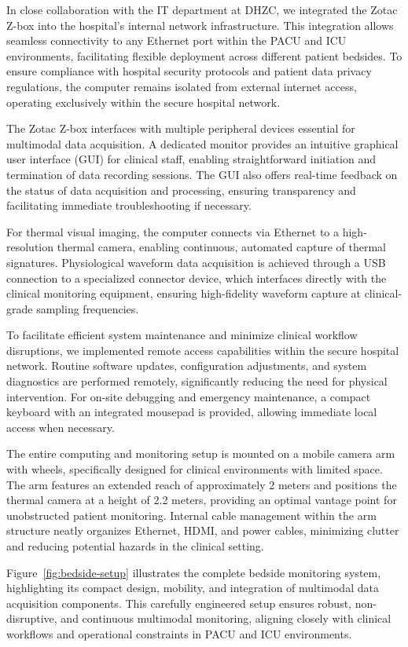 In close collaboration with the IT department at DHZC, we integrated the Zotac Z-box into the hospital's internal network infrastructure. This integration allows seamless connectivity to any Ethernet port within the PACU and ICU environments, facilitating flexible deployment across different patient bedsides. To ensure compliance with hospital security protocols and patient data privacy regulations, the computer remains isolated from external internet access, operating exclusively within the secure hospital network.

The Zotac Z-box interfaces with multiple peripheral devices essential for multimodal data acquisition. A dedicated monitor provides an intuitive graphical user interface (GUI) for clinical staff, enabling straightforward initiation and termination of data recording sessions. The GUI also offers real-time feedback on the status of data acquisition and processing, ensuring transparency and facilitating immediate troubleshooting if necessary.

For thermal visual imaging, the computer connects via Ethernet to a high-resolution thermal camera, enabling continuous, automated capture of thermal signatures. Physiological waveform data acquisition is achieved through a USB connection to a specialized connector device, which interfaces directly with the clinical monitoring equipment, ensuring high-fidelity waveform capture at clinical-grade sampling frequencies.

To facilitate efficient system maintenance and minimize clinical workflow disruptions, we implemented remote access capabilities within the secure hospital network. Routine software updates, configuration adjustments, and system diagnostics are performed remotely, significantly reducing the need for physical intervention. For on-site debugging and emergency maintenance, a compact keyboard with an integrated mousepad is provided, allowing immediate local access when necessary.

The entire computing and monitoring setup is mounted on a mobile camera arm with wheels, specifically designed for clinical environments with limited space. The arm features an extended reach of approximately 2 meters and positions the thermal camera at a height of 2.2 meters, providing an optimal vantage point for unobstructed patient monitoring. Internal cable management within the arm structure neatly organizes Ethernet, HDMI, and power cables, minimizing clutter and reducing potential hazards in the clinical setting.

Figure~\ref{fig:bedside-setup} illustrates the complete bedside monitoring system, highlighting its compact design, mobility, and integration of multimodal data acquisition components. This carefully engineered setup ensures robust, non-disruptive, and continuous multimodal monitoring, aligning closely with clinical workflows and operational constraints in PACU and ICU environments.

